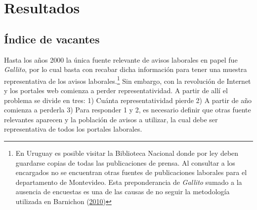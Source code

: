 \documentclass[12pt,oneside]{reedthesis}
\begin{document}
\hypertarget{cap:Resultados}{%
\chapter{Resultados}\label{cap:Resultados}}

\hypertarget{uxedndice-de-vacantes}{%
\section{Índice de vacantes}\label{uxedndice-de-vacantes}}

Hasta los años 2000 la única fuente relevante de avisos laborales en papel fue \emph{Gallito}, por lo cual basta con recabar dicha información para tener una muestra representativa de los avisos laborales.\footnote{En Uruguay es posible visitar la Biblioteca Nacional donde por ley deben guardarse copias de todas las publicaciones de prensa. Al consultar a los encargados no se encuentran otras fuentes de publicaciones laborales para el departamento de Montevideo. Esta preponderancia de \emph{Gallito} sumado a la ausencia de encuestas es una de las causas de no seguir la metodología utilizada en Barnichon (\protect\hyperlink{ref-Barnichon2010}{2010})} Sin embargo, con la revolución de Internet y los portales web comienza a perder representatividad. A partir de allí el problema se divide en tres: 1) Cuánta representatividad pierde 2) A partir de año comienza a perderla 3) Para responder 1 y 2, es necesario definir que otras fuente relevantes aparecen y la población de avisos a utilizar, la cual debe ser representativa de todos los portales laborales.
\end{document}
